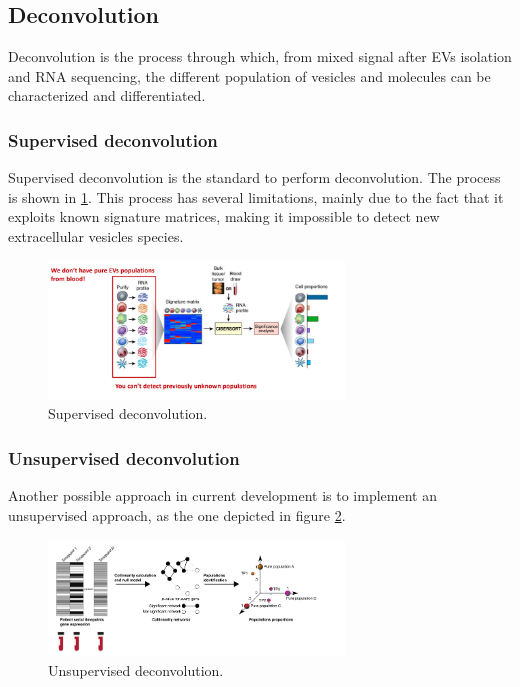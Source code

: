     \subsection{Deconvolution}
    Deconvolution is the process through which, from mixed signal after EVs isolation and RNA sequencing, the different population of vesicles and molecules can be characterized and differentiated.

        \subsubsection{Supervised deconvolution}
        Supervised deconvolution is the standard to perform deconvolution.
        The process is shown in \ref{fig:sup}.
        This process has several limitations, mainly due to the fact that it exploits known signature matrices, making it impossible to detect new extracellular vesicles species.

        \begin{figure}[H]
            \centering
            \includegraphics[width=0.7\textwidth]{supervised_devo.png}
            \caption{Supervised deconvolution.}
            \label{fig:sup}
        \end{figure}

        \subsubsection{Unsupervised deconvolution}
        Another possible approach in current development is to implement an unsupervised approach, as the one depicted in figure \ref{fig:unsup}.

        \begin{figure}[H]
            \centering
            \includegraphics[width=0.7\textwidth]{unsupervised_deco.png}
            \caption{Unsupervised deconvolution.}
            \label{fig:unsup}
        \end{figure}

